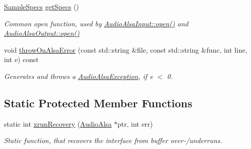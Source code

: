 \begin{DoxyCompactItemize}
\item 
\hyperlink{structNl_1_1SampleSpecs}{Sample\-Specs} \hyperlink{group__Audio_gac48ddd5186e4c084dc1b7c7457ecb64a}{get\-Specs} ()
\begin{DoxyCompactList}\small\item\em Common open function, used by \hyperlink{classNl_1_1AudioAlsaInput_a9e3afb8dfb0615d745a4f362302ce99d}{Audio\-Alsa\-Input\-::open()} and \hyperlink{classNl_1_1AudioAlsaOutput_a94792430810853353314a71f1b54a5d3}{Audio\-Alsa\-Output\-::open()} \end{DoxyCompactList}\item 
void \hyperlink{group__Audio_ga49001b5030e29d798858025458a0d8ad}{throw\-On\-Alsa\-Error} (const std\-::string \&file, const std\-::string \&func, int line, int e) const 
\begin{DoxyCompactList}\small\item\em Generates and throws a \hyperlink{classNl_1_1AudioAlsaException}{Audio\-Alsa\-Exception}, if {\itshape e} $<$ 0. \end{DoxyCompactList}\end{DoxyCompactItemize}
\subsection*{Static Protected Member Functions}
\begin{DoxyCompactItemize}
\item 
static int \hyperlink{group__Audio_ga3bfd0415c0694893adda600459e54d2e}{xrun\-Recovery} (\hyperlink{classNl_1_1AudioAlsa}{Audio\-Alsa} $\ast$ptr, int err)
\begin{DoxyCompactList}\small\item\em Static function, that recovers the interface from buffer over-\//underruns. \end{DoxyCompactList}\end{DoxyCompactItemize}
